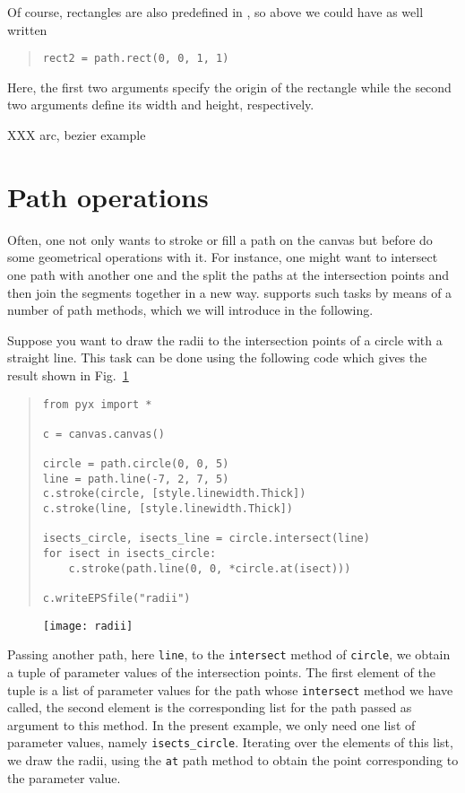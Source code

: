 Of course, rectangles are also predefined in \PyX{}, so above we could
have as well written
\begin{quote}
\begin{verbatim}
rect2 = path.rect(0, 0, 1, 1)
\end{verbatim}
\end{quote}
Here, the first two arguments specify the origin of the rectangle
while the second two arguments define its width and height,
respectively.

XXX arc, bezier example

\section{Path operations}

Often, one not only wants to stroke or fill a path on the canvas
but before do some geometrical operations with it. For instance, one
might want to intersect one path with another one and the split the
paths at the intersection points and then join the segments together
in a new way. \PyX{} supports such tasks by means of a number
of path methods, which we will introduce in the following.

Suppose you want to draw the radii to the intersection points of a
circle with a straight line. This task can be done using the following
code which gives the result shown in Fig.~\ref{fig:radii}
\begin{quote}
\begin{verbatim}
from pyx import *

c = canvas.canvas()

circle = path.circle(0, 0, 5)
line = path.line(-7, 2, 7, 5)
c.stroke(circle, [style.linewidth.Thick])
c.stroke(line, [style.linewidth.Thick])

isects_circle, isects_line = circle.intersect(line)
for isect in isects_circle:
    c.stroke(path.line(0, 0, *circle.at(isect)))

c.writeEPSfile("radii")
\end{verbatim}
\end{quote}
\begin{figure}
\centerline{\texttt{[image: radii]}}
\label{fig:radii}
\end{figure}
Passing another path, here \verb|line|, to the \verb|intersect| method
of \verb|circle|, we obtain a tuple of parameter values of the
intersection points. The first element of the tuple is a list of
parameter values for the path whose \verb|intersect| method we have
called, the second element is the corresponding list for the path
passed as argument to this method. In the present example, we only
need one list of parameter values, namely \verb|isects_circle|.
Iterating over the elements of this list, we draw the radii, using the
\verb|at| path method to obtain the point corresponding to the
parameter value.

